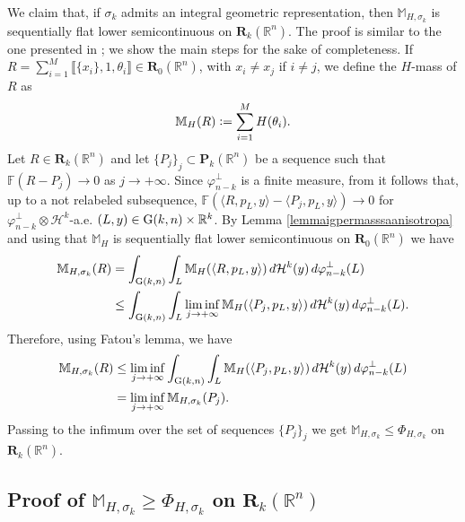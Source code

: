 \documentclass{article}
\numberwithin{equation}{section}
\theoremstyle{plain}%
\theoremstyle{definition}
\theoremstyle{definition}
\newcommand{\rgrande}{\mathbb{R}}
\newcommand{\haus}{\mathcal{H}}
\newcommand{\corrett}{\mathbf{R}_k(\rgrande^n)}
\newcommand{\correttvar}[2]{\mathbf{R}_{#1}(\rgrande^{#2})}
\newcommand{\corrpol}{\mathbf{P}_k(\rgrande^n)}
\newcommand{\normaflat}{\mathbb{F}}
\newcommand{\massa}{\mathbb{M}}
\newcommand{\massaanisotropa}{\mathbb{M}_{H,\sigma_k}}
\newcommand{\grass}{{\rm G}}
\newcommand{\grasskn}{\grass(k,n)}
\newcommand{\slice}[3]{\langle{#1} , {#2}, {#3} \rangle}
\begin{document}
We claim that, if $\sigma_k$ admits an integral geometric representation, then $\massaanisotropa$ is sequentially flat lower semicontinuous on $\corrett$.
The proof is similar to the one presented in \cite{cdrms17}; we show the main steps for the sake of completeness. If $ R = \sum_{i = 1}^M \llbracket \{ x_i\}, 1 , \theta_i \rrbracket \in \correttvar{0}{n}$, with $x_i \neq x_j$ if $i \neq j$, we define the $H$-mass of $R$ as
\begin{equation*}
    \massa_H (R)
 \vcentcolon =
  \sum_{i=1}^M H(\theta_i)
  \text{.}
\end{equation*}
Let $R \in \corrett$ and let $\{ P_j \}_j \subset \corrpol$ be a sequence such that $\normaflat(R- P_j) \longrightarrow 0$ as $j \to + \infty$. Since $\varphi_{n-k}^{\perp}$ is a finite measure, from \cite[Prop. 2.6]{cdrms17} it follows that, up to a not relabeled subsequence, $\normaflat(\slice{R}{p_L}{y} - \slice{P_j}{p_L}{y}) \longrightarrow 0$ for $\varphi_{n-k}^{\perp} \otimes \haus^k$-a.e. $(L,y) \in \grasskn \times \rgrande^k$. By Lemma \ref{lemmaigpermasssaanisotropa} and using that $\massa_H$ is sequentially flat lower semicontinuous on $\correttvar{0}{n}$ we have
\begin{equation*}
    \begin{split}
    \massaanisotropa(R) & =
    \int_{\grasskn} {
\int_{L} {
\massa_H (\slice{R}{p_L}{y})
}
\, d \haus^k (y)
} \, d \varphi_{n-k}^{\perp} (L) \\
&
\leq
\int_{\grasskn} {
\int_{L} {
\liminf_{j \to + \infty}
\massa_H (\slice{P_j}{p_L}{y})
}
\, d \haus^k (y)
} \, d \varphi_{n-k}^{\perp} (L)
\text{.}
\end{split}
\end{equation*}
Therefore, using Fatou's lemma, we have
\begin{equation*}
    \begin{split}
        \massaanisotropa(R) &
        \leq
\liminf_{j \to + \infty}
\int_{\grasskn} {
\int_{L} {
\massa_H (\slice{P_j}{p_L}{y})
}
\, d \haus^k (y)
} \, d \varphi_{n-k}^{\perp} (L) \\
&
=
\liminf_{j \to + \infty} \massaanisotropa (P_j)
\text{.}
    \end{split}
\end{equation*}
Passing to the infimum over the set of sequences $\{ P_j \}_j$ we get $
\massaanisotropa \leq \Phi_{H,\sigma_k}$ on $\corrett$.

\subsection{Proof of $\massaanisotropa \geq \Phi_{H,\sigma_k}$ on $\corrett$}
\end{document}
